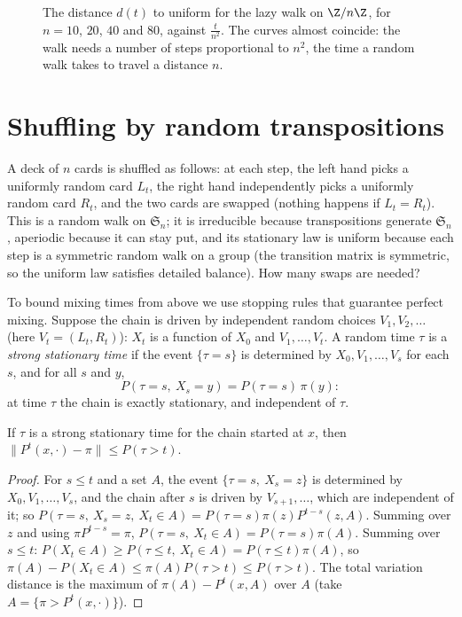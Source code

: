 \begin{figure}[ht]
\centering
{}
\caption{The distance $d(t)$ to uniform for the lazy walk on $\Z/n\Z$, for $n=10$, $20$, $40$ and $80$, against $\frac t{n^2}$. The curves almost
coincide: the walk needs a number of steps proportional to $n^2$, the time a random walk takes to travel a distance $n$.}
\label{fig:cycle}
\end{figure}

\section{Shuffling by random transpositions}

A deck of $n$ cards is shuffled as follows: at each step, the left hand picks a uniformly random card $L_t$, the right hand
independently picks a uniformly random card $R_t$, and the two cards are swapped (nothing happens if $L_t=R_t$). This is a
random walk on $\mathfrak S_n$; it is irreducible because transpositions generate $\mathfrak S_n$, aperiodic because it can stay put, and its
stationary law is uniform because each step is a symmetric random walk on a group (the transition matrix is symmetric,
so the uniform law satisfies detailed balance). How many swaps are needed?

To bound mixing times from above we use stopping rules that guarantee perfect mixing. Suppose the chain is driven by
independent random choices $V_1,V_2,\ldots$ (here $V_t=(L_t,R_t)$): $X_t$ is a function of $X_0$ and $V_1,\dots,V_t$. A random time $\tau$ is a
\emph{strong stationary time} if the event $\{\tau=s\}$ is determined by $X_0,V_1,\dots,V_s$ for each $s$, and
for all $s$ and $y$,
\[
P(\tau=s,\ X_s=y)=P(\tau=s)\,\pi(y):
\]
at time $\tau$ the chain is exactly stationary, and independent of $\tau$.

\begin{proposition}\label{prop:sst}
If $\tau$ is a strong stationary time for the chain started at $x$, then $\|P^t(x,\cdot)-\pi\|\le P(\tau>t)$.
\end{proposition}
\begin{proof}
For $s\le t$ and a set $A$, the event $\{\tau=s,\ X_s=z\}$ is determined by $X_0,V_1,\dots,V_s$, and the chain after $s$ is driven by $V_{s+1},\ldots$,
which are independent of it; so $P(\tau=s,\ X_s=z,\ X_t\in A)=P(\tau=s)\pi(z)P^{t-s}(z,A)$. Summing over $z$ and using $\pi P^{t-s}=\pi$,
$P(\tau=s,\ X_t\in A)=P(\tau=s)\pi(A)$. Summing over $s\le t$: $P(X_t\in A)\ge P(\tau\le t,\ X_t\in A)=P(\tau\le t)\pi(A)$, so
$\pi(A)-P(X_t\in A)\le\pi(A)P(\tau>t)\le P(\tau>t)$. The total variation distance is the maximum of $\pi(A)-P^t(x,A)$ over $A$ (take $A=\{\pi>P^t(x,\cdot)\}$).
\end{proof}

